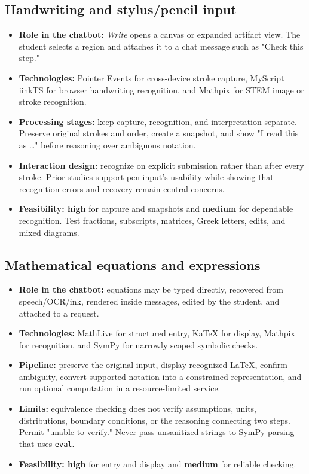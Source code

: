 \documentclass[11pt]{article}
\begin{document}
\subsection{Handwriting and stylus/pencil input}
\begin{itemize}
\item \textbf{Role in the chatbot:} \emph{Write} opens a canvas or expanded artifact view. The student selects a region and attaches it to a chat message such as "Check this step."
\item \textbf{Technologies:} Pointer Events for cross-device stroke capture, MyScript iinkTS for browser handwriting recognition, and Mathpix for STEM image or stroke recognition.\cite{pointer,myscript,mathpix}
\item \textbf{Processing stages:} keep capture, recognition, and interpretation separate. Preserve original strokes and order, create a snapshot, and show "I read this as \ldots" before reasoning over ambiguous notation.
\item \textbf{Interaction design:} recognize on explicit submission rather than after every stroke. Prior studies support pen input's usability while showing that recognition errors and recovery remain central concerns.\cite{handwritingparadigm,handwritingimpact,handwritingreview}
\item \textbf{Feasibility: high} for capture and snapshots and \textbf{medium} for dependable recognition. Test fractions, subscripts, matrices, Greek letters, edits, and mixed diagrams.
\end{itemize}

\subsection{Mathematical equations and expressions}
\begin{itemize}
\item \textbf{Role in the chatbot:} equations may be typed directly, recovered from speech/OCR/ink, rendered inside messages, edited by the student, and attached to a request.
\item \textbf{Technologies:} MathLive for structured entry, KaTeX for display, Mathpix for recognition, and SymPy for narrowly scoped symbolic checks.\cite{mathlive,katex,mathpix,sympy}
\item \textbf{Pipeline:} preserve the original input, display recognized LaTeX, confirm ambiguity, convert supported notation into a constrained representation, and run optional computation in a resource-limited service.
\item \textbf{Limits:} equivalence checking does not verify assumptions, units, distributions, boundary conditions, or the reasoning connecting two steps. Permit "unable to verify." Never pass unsanitized strings to SymPy parsing that uses \texttt{eval}.\cite{sympy}
\item \textbf{Feasibility: high} for entry and display and \textbf{medium} for reliable checking.
\end{itemize}
\end{document}
